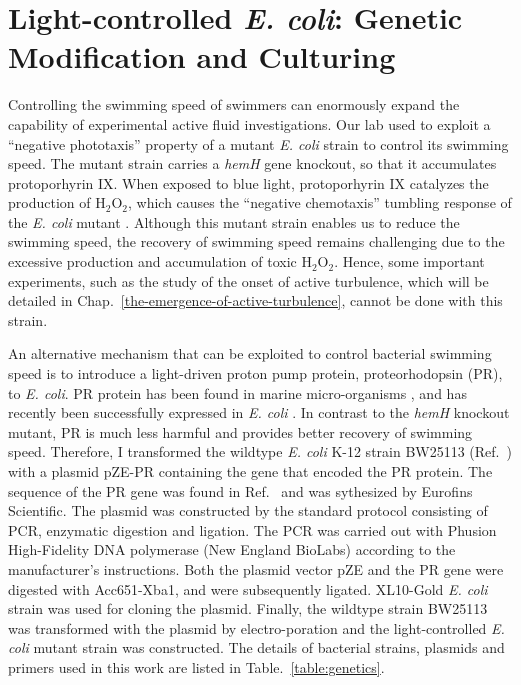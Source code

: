 \section{Light-controlled \textit{E. coli}: Genetic Modification and Culturing}
\label{light-controlled-E-coli-genetic-modification-culturing-and-trouble-shooting}
Controlling the swimming speed of swimmers can enormously expand the capability of experimental active fluid investigations. Our lab used to exploit a ``negative phototaxis'' property of a mutant \textit{E. coli} strain to control its swimming speed. The mutant strain carries a \textit{hemH} gene knockout, so that it accumulates protoporhyrin IX. When exposed to blue light, protoporhyrin IX catalyzes the production of H$_2$O$_2$, which causes the ``negative chemotaxis'' tumbling response of the \textit{E. coli} mutant \cite{Yang1995}. Although this mutant strain enables us to reduce the swimming speed, the recovery of swimming speed remains challenging due to the excessive production and accumulation of toxic H$_2$O$_2$. Hence, some important experiments, such as the study of the onset of active turbulence, which will be detailed in Chap.~\ref{the-emergence-of-active-turbulence}, cannot be done with this strain.

An alternative mechanism that can be exploited to control bacterial swimming speed is to introduce a light-driven proton pump protein, proteorhodopsin (PR), to \textit{E. coli}. PR protein has been found in marine micro-organisms \cite{Beja2000, DelaTorre2003}, and has recently been successfully expressed in \textit{E. coli} \cite{Walter2007}. In contrast to the \textit{hemH} knockout mutant, PR is much less harmful and provides better recovery of swimming speed. Therefore, I transformed the wildtype \textit{E. coli} K-12 strain BW25113 (Ref.~\cite{Datsenko2000}) with a plasmid pZE-PR containing the gene that encoded the PR protein. The sequence of the PR gene was found in Ref.~\cite{DelaTorre2003} and was sythesized by Eurofins Scientific.
The plasmid was constructed by the standard protocol consisting of PCR, enzymatic digestion and ligation. The PCR was carried out with Phusion High-Fidelity DNA polymerase (New England BioLabs) according to the manufacturer's instructions. Both the plasmid vector pZE and the PR gene were digested with Acc651-Xba1, and were subsequently ligated. XL10-Gold \textit{E. coli} strain was used for cloning the plasmid. Finally, the wildtype strain BW25113 was transformed with the plasmid by electro-poration and the light-controlled \textit{E. coli} mutant strain was constructed. The details of bacterial strains, plasmids and primers used in this work are listed in Table.~\ref{table:genetics}.

